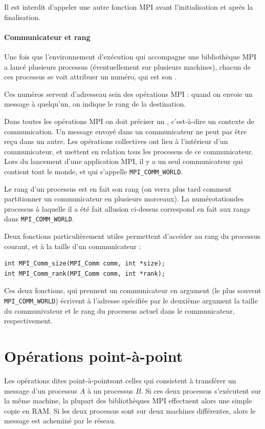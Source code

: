 Il est interdit d'appeler une autre fonction MPI avant l'initialisation et après
la finalisation.

\paragraph{Communicateur et rang} Une fois que l'environnement
d'exécution qui accompagne une bibliothèque MPI a lancé plusieurs
processus (éventuellement sur plusieurs machines), chacun de ces
processus se voit attribuer un numéro, qui est son .

Ces numéros servent \og d'adresse\fg au sein des opérations MPI :
quand on envoie un message à quelqu'un, on indique le rang de la
destination.

Dans toutes les opérations MPI on doit préciser un
, c'est-à-dire un \og contexte de
communication\fg. Un message envoyé dans un communicateur ne peut pas
être reçu dans un autre. Les opérations collectives ont lieu à
l'intérieur d'un communicateur, et mettent en relation tous les
processus de ce communicateur. Lors du lancement d'une application
MPI, il y a un seul communicateur qui contient tout le monde, et qui
s'appelle \texttt{MPI\_COMM\_WORLD}.

Le rang d'un processus est en fait son rang  (on verra plus tard comment partitionner un
communicateur en plusieurs morceaux). La \og numérotation\fg des
processus à laquelle il a été fait allusion ci-dessus correspond en
fait aux rangs dans \texttt{MPI\_COMM\_WORLD}.

Deux fonctions particulièrement utiles permettent d'accéder au rang du
processus courant, et à la taille d'un communicateur :
\begin{verbatim}
int MPI_Comm_size(MPI_Comm comm, int *size);
int MPI_Comm_rank(MPI_Comm comm, int *rank);
\end{verbatim}

Ces deux fonctions, qui prennent un communicateur en argument (le plus
souvent \verb|MPI_COMM_WORLD|) écrivent à l'adresse spécifiée par le
deuxième argument la taille du communivateur et le rang du processus
actuel dans le communicateur, respectivement.

\section{Opérations point-à-point}

Les opérations dites \og point-à-point\fg sont celles qui consistent à
transférer un message d'un processus $A$ à un processus $B$. Si ces
deux processus s'exécutent sur la même machine, la plupart des
bibliothèques MPI effectuent alors une simple copie en RAM. Si les deux
processus sont sur deux machines différentes, alors le message est
acheminé par le réseau.

